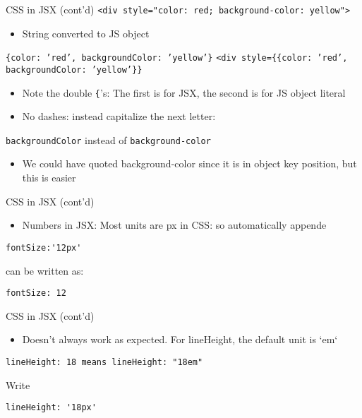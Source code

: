 \documentclass[presentation]{beamer}
\begin{document}
\begin{frame}[fragile,label={sec:orgheadline11}]{CSS in JSX (cont'd)}
 \texttt{<div style="color: red; background-color: yellow">}
\begin{itemize}
\item String converted to JS object
\end{itemize}
\texttt{\{color: 'red', backgroundColor: 'yellow'\}}
\texttt{<div style=\{\{color: 'red', backgroundColor: 'yellow'\}\}}
\begin{itemize}
\item Note the double \texttt{\{}'s: The first is for JSX, the second is for JS object
literal
\item No dashes: instead capitalize the next letter:
\end{itemize}
\texttt{backgroundColor} instead of \texttt{background-color}
\begin{itemize}
\item We could have quoted background-color since it is in object key position,
but this is easier
\end{itemize}
\end{frame}

\begin{frame}[fragile,label={sec:orgheadline12}]{CSS in JSX (cont'd)}
 \begin{itemize}
\item Numbers in JSX: Most units are px in CSS: so automatically appende
\end{itemize}
\begin{verbatim}
fontSize:'12px'
\end{verbatim}
can be written as:
\begin{verbatim}
fontSize: 12
\end{verbatim}
\end{frame}

\begin{frame}[fragile,label={sec:orgheadline13}]{CSS in JSX (cont'd)}
 \begin{itemize}
\item Doesn't always work as expected. For lineHeight, the default unit is `em`
\end{itemize}
\begin{verbatim}
lineHeight: 18 means lineHeight: "18em"
\end{verbatim}

Write
\begin{verbatim}
lineHeight: '18px'
\end{verbatim}
\end{frame}
\end{document}

